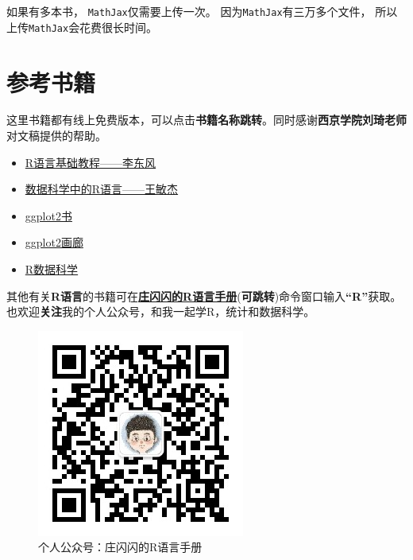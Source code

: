 \documentclass[
]{book}
\begin{document}
如果有多本书，
\texttt{MathJax}仅需要上传一次。
因为\texttt{MathJax}有三万多个文件，
所以上传\texttt{MathJax}会花费很长时间。

\hypertarget{reference}{%
\chapter{参考书籍}\label{reference}}

这里书籍都有线上免费版本，可以点击\textbf{书籍名称跳转}。同时感谢\textbf{西京学院刘琦老师}对文稿提供的帮助。

\begin{itemize}
\item
  \href{https://www.math.pku.edu.cn/teachers/lidf/docs/Rbook/html/_Rbook/graph.html}{R语言基础教程------李东风}
\item
  \href{https://bookdown.org/wangminjie/R4DS/intro-R.html\#\%E5\%AE\%89\%E8\%A3\%85-rstudio}{数据科学中的R语言------王敏杰}
\item
  \href{https://ggplot2-book.org/}{ggplot2书}
\item
  \href{https://www.r-graph-gallery.com/ggplot2-package.html}{ggplot2画廊}
\item
  \href{https://r4ds.had.co.nz/}{R数据科学}
\end{itemize}

其他有关\textbf{R语言}的书籍可在\href{https://mp.weixin.qq.com/mp/profile_ext?action=home\&__biz=MzI1NjUwMjQxMQ==\&scene=124\#wechat_redirect}{\textbf{庄闪闪的R语言手册}}(\textbf{可跳转})命令窗口输入\textbf{``R''}获取。也欢迎\textbf{关注}我的个人公众号，和我一起学R，统计和数据科学。

\begin{figure}

{\centering \includegraphics[width=0.45\linewidth]{figure/vcode} 

}

\caption{个人公众号：庄闪闪的R语言手册}\label{fig:unnamed-chunk-1}
\end{figure}
\end{document}
